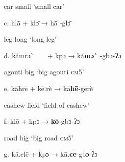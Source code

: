 \begin{styleindexi}
              car                small                                    ‘small car’  
\end{styleindexi}

\begin{styleindexi}
            c.   hlã\={}           +      klɔ\={}                           →        hã\={} -glɔ\={}                     
\end{styleindexi}

\begin{styleindexi}
                leg                long                                  ‘long leg’
\end{styleindexi}

\begin{styleindexi}
            d.  kámrɔ\`{} ~ ~    +      kpɔ                          →        ká\textbf{mɔ\`{} }{}-gbɔ-ʔɔ  
\end{styleindexi}

\begin{styleindexi}
                agouti            big                                    ‘big agouti \textsc{cm}5’        
\end{styleindexi}

\begin{styleindexi}
            e.  kāhrē        +      kēːrè                        →        kā\textbf{hē}{}-gērè                
\end{styleindexi}

\begin{styleindexi}
                cashew            field                                  ‘field of cashew’ 
\end{styleindexi}

\begin{styleindexi}
            f.  klō             +      kpɔ                          →       \textbf{kō}{}-gbɔ-ʔɔ         
\end{styleindexi}

\begin{styleindexi}
                  road                  big                                    ‘big road \textsc{cm}5’
\end{styleindexi}

\begin{styleindexi}
            g.  kā.clē       +     kpɔ                            →       kā.\textbf{cē}{}-gbɔ-ʔɔ     
\end{styleindexi}

